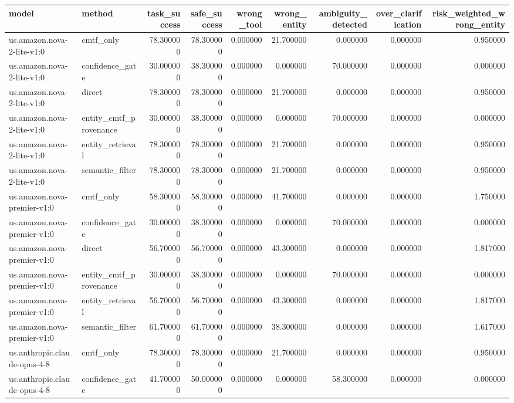 \begin{tabular}{llrrrrrrr}
\toprule
model & method & task_success & safe_success & wrong_tool & wrong_entity & ambiguity_detected & over_clarification & risk_weighted_wrong_entity \\
\midrule
us.amazon.nova-2-lite-v1:0 & cmtf_only & 78.300000 & 78.300000 & 0.000000 & 21.700000 & 0.000000 & 0.000000 & 0.950000 \\
us.amazon.nova-2-lite-v1:0 & confidence_gate & 30.000000 & 38.300000 & 0.000000 & 0.000000 & 70.000000 & 0.000000 & 0.000000 \\
us.amazon.nova-2-lite-v1:0 & direct & 78.300000 & 78.300000 & 0.000000 & 21.700000 & 0.000000 & 0.000000 & 0.950000 \\
us.amazon.nova-2-lite-v1:0 & entity_cmtf_provenance & 30.000000 & 38.300000 & 0.000000 & 0.000000 & 70.000000 & 0.000000 & 0.000000 \\
us.amazon.nova-2-lite-v1:0 & entity_retrieval & 78.300000 & 78.300000 & 0.000000 & 21.700000 & 0.000000 & 0.000000 & 0.950000 \\
us.amazon.nova-2-lite-v1:0 & semantic_filter & 78.300000 & 78.300000 & 0.000000 & 21.700000 & 0.000000 & 0.000000 & 0.950000 \\
us.amazon.nova-premier-v1:0 & cmtf_only & 58.300000 & 58.300000 & 0.000000 & 41.700000 & 0.000000 & 0.000000 & 1.750000 \\
us.amazon.nova-premier-v1:0 & confidence_gate & 30.000000 & 38.300000 & 0.000000 & 0.000000 & 70.000000 & 0.000000 & 0.000000 \\
us.amazon.nova-premier-v1:0 & direct & 56.700000 & 56.700000 & 0.000000 & 43.300000 & 0.000000 & 0.000000 & 1.817000 \\
us.amazon.nova-premier-v1:0 & entity_cmtf_provenance & 30.000000 & 38.300000 & 0.000000 & 0.000000 & 70.000000 & 0.000000 & 0.000000 \\
us.amazon.nova-premier-v1:0 & entity_retrieval & 56.700000 & 56.700000 & 0.000000 & 43.300000 & 0.000000 & 0.000000 & 1.817000 \\
us.amazon.nova-premier-v1:0 & semantic_filter & 61.700000 & 61.700000 & 0.000000 & 38.300000 & 0.000000 & 0.000000 & 1.617000 \\
us.anthropic.claude-opus-4-8 & cmtf_only & 78.300000 & 78.300000 & 0.000000 & 21.700000 & 0.000000 & 0.000000 & 0.950000 \\
us.anthropic.claude-opus-4-8 & confidence_gate & 41.700000 & 50.000000 & 0.000000 & 0.000000 & 58.300000 & 0.000000 & 0.000000 \\

\end{tabular}
